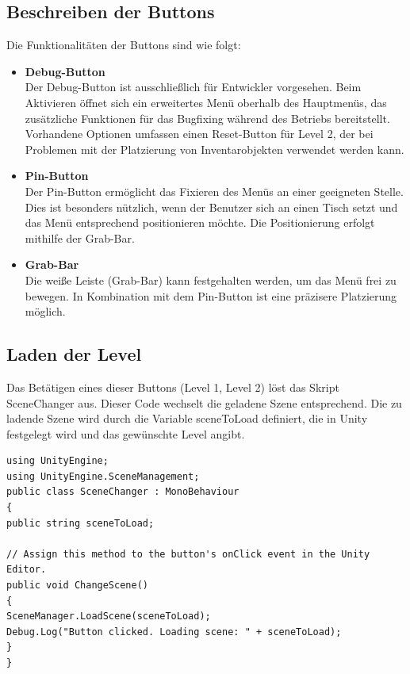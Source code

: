 \subsection{Beschreiben der Buttons}
Die Funktionalitäten der Buttons sind wie folgt:

\begin{itemize}
\item \textbf{Debug-Button}\\
Der Debug-Button ist ausschließlich für Entwickler vorgesehen. Beim Aktivieren öffnet sich ein erweitertes
Menü oberhalb des Hauptmenüs, das zusätzliche Funktionen für das Bugfixing während des Betriebs bereitstellt.
Vorhandene Optionen umfassen einen Reset-Button für Level 2, der bei Problemen mit der Platzierung von
Inventarobjekten verwendet werden kann.

\item \textbf{Pin-Button}\\
Der Pin-Button ermöglicht das Fixieren des Menüs an einer geeigneten Stelle. Dies ist besonders nützlich,
wenn der Benutzer sich an einen Tisch setzt und das Menü entsprechend positionieren möchte. Die
Positionierung erfolgt mithilfe der Grab-Bar.

\item \textbf{Grab-Bar}\\
Die weiße Leiste (Grab-Bar) kann festgehalten werden, um das Menü frei zu bewegen. In Kombination mit dem
Pin-Button ist eine präzisere Platzierung möglich.
\end{itemize}

\subsection{Laden der Level}
Das Betätigen eines dieser Buttons (Level 1, Level 2) löst das Skript SceneChanger aus. Dieser Code wechselt die geladene
Szene entsprechend. Die zu ladende Szene wird durch die Variable sceneToLoad definiert, die in Unity
festgelegt wird und das gewünschte Level angibt.

\begin{lstlisting}[style=csharp, caption=Auf Knopfdruck Szene wechseln.]
using UnityEngine;
using UnityEngine.SceneManagement;
public class SceneChanger : MonoBehaviour
{
public string sceneToLoad;

// Assign this method to the button's onClick event in the Unity Editor.
public void ChangeScene()
{
SceneManager.LoadScene(sceneToLoad);
Debug.Log("Button clicked. Loading scene: " + sceneToLoad);
}
}
\end{lstlisting}

